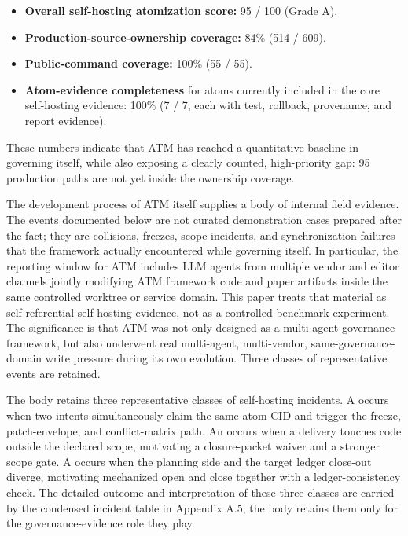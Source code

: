 \documentclass[9pt,letterpaper]{extarticle}
\begin{document}
\begin{itemize}
\item \textbf{Overall self-hosting atomization score:} 95 / 100 (Grade A).
\item \textbf{Production-source-ownership coverage:} 84\% (514 / 609).
\item \textbf{Public-command coverage:} 100\% (55 / 55).
\item \textbf{Atom-evidence completeness} for atoms currently included in the core self-hosting evidence: 100\% (7 / 7, each with test, rollback, provenance, and report evidence).
\end{itemize}

These numbers indicate that ATM has reached a quantitative baseline in governing itself, while also exposing a clearly counted, high-priority gap: 95 production paths are not yet inside the ownership coverage.

The development process of ATM itself supplies a body of internal field evidence. The events documented below are not curated demonstration cases prepared after the fact; they are collisions, freezes, scope incidents, and synchronization failures that the framework actually encountered while governing itself. In particular, the reporting window for ATM includes LLM agents from multiple vendor and editor channels jointly modifying ATM framework code and paper artifacts inside the same controlled worktree or service domain. This paper treats that material as self-referential self-hosting evidence, not as a controlled benchmark experiment. The significance is that ATM was not only designed as a multi-agent governance framework, but also underwent real multi-agent, multi-vendor, same-governance-domain write pressure during its own evolution. Three classes of representative events are retained.

The body retains three representative classes of self-hosting incidents. A \texttt{} occurs when two intents simultaneously claim the same atom CID and trigger the freeze, patch-envelope, and conflict-matrix path. An \texttt{} occurs when a delivery touches code outside the declared scope, motivating a closure-packet waiver and a stronger scope gate. A \texttt{} occurs when the planning side and the target ledger close-out diverge, motivating mechanized open and close together with a ledger-consistency check. The detailed outcome and interpretation of these three classes are carried by the condensed incident table in Appendix A.5; the body retains them only for the governance-evidence role they play.
\end{document}
